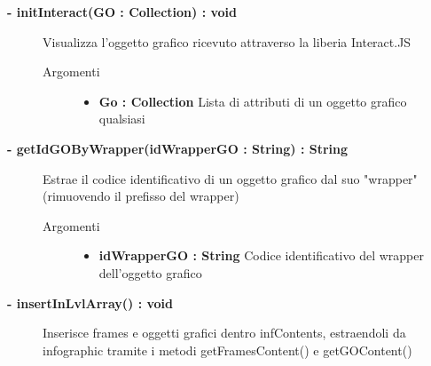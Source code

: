 \begin{description}
	\begin{description}
		\item[\textbf{\color{blue}- initInteract(GO : Collection) : void		}] \hfill
			Visualizza l'oggetto grafico ricevuto attraverso la liberia Interact.JS
			
		\begin{description}
			\item[Argomenti] \hfill
				\begin{itemize}
				
					\item \textbf{Go : Collection		} \hfill
					Lista di attributi di un oggetto grafico qualsiasi
					
				\end{itemize}
			
		\end{description}
	\end{description}
	
	\begin{description}
		\item[\textbf{\color{blue}- getIdGOByWrapper(idWrapperGO : String) : String		}] \hfill
			Estrae il codice identificativo di un oggetto grafico dal suo "wrapper" (rimuovendo il prefisso del wrapper)
			
		\begin{description}
			\item[Argomenti] \hfill
				\begin{itemize}
				
					\item \textbf{idWrapperGO : String		} \hfill
					Codice identificativo del wrapper dell'oggetto grafico
					
				\end{itemize}
			
		\end{description}
	\end{description}
	
	\begin{description}
		\item[\textbf{\color{blue}- insertInLvlArray() : void		}] \hfill
			Inserisce frames e oggetti grafici dentro infContents, estraendoli da infographic tramite i metodi getFramesContent() e getGOContent()
			
	\end{description}
	

\end{description}
